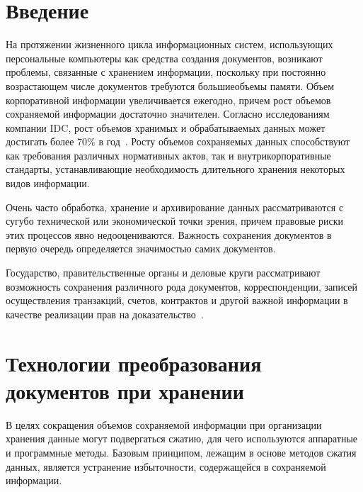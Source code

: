       \begin{multicols}{2}

      \label{st\stat}

\section{Введение}

     На протяжении жизненного цикла информа\-ционных систем, 
использующих персональные компьютеры как средства создания документов, 
возникают проблемы, связанные с хранением информации, поскольку при 
постоянно возраста\-ющем числе документов требуются большие\linebreak объемы 
памяти. Объем корпоративной информации увеличивается ежегодно, причем 
рост \mbox{объемов} со\-хра\-ня\-емой информации достаточно значителен. Согласно 
исследованиям компании IDC, рост объемов хранимых и обрабатываемых 
данных может достигать более 70\% в год~\cite{11che}. Росту объемов 
со\-хра\-ня\-емых данных способствуют как требования различных нормативных 
актов, так и внутрикорпоративные стандарты, устанавливающие 
необходимость  длительного хранения некоторых видов информации. 
{ %

}

Очень 
часто обработка, хранение и архивирование данных рассматриваются с сугубо 
технической или экономической точки зрения, причем правовые риски этих 
процессов явно недооцениваются. Важность сохранения документов в первую 
очередь определяется значимостью самих доку\-ментов. 
{

}

Государство, 
правительственные органы и деловые круги рассматривают возможность 
сохранения различного рода документов, корреспонденции, записей 
осуществления транзакций, счетов, контрактов и другой важной информации в 
качестве реализации прав на доказательство~\cite{10che}. 

\section{Технологии преобразования документов при хранении}
     
     В целях сокращения объемов сохраняемой информации при организации 
хранения данные могут подвергаться сжатию, для чего используются 
аппаратные и программные методы. Базовым принципом, лежащим в основе 
методов сжатия данных, является устранение избыточности, содержащейся в 
сохраняемой информации.
     

\end{multicols}
